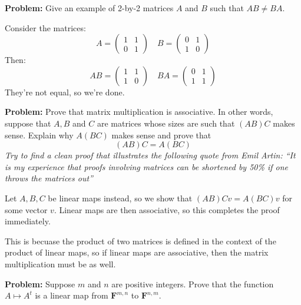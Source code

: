 \documentclass[10pt]{article}
\newcommand{\F}{\mathbf F}
\newenvironment{problem}{\textbf{Problem:}}{}
\begin{document}
	\begin{problem}
		Give an example of 2-by-2 matrices \( A \) and \( B \) such that \( AB \neq BA \). 
	\end{problem}

	\begin{solution}
		Consider the matrices:
		\[
			A = \begin{pmatrix} 1 & 1\\0 &1 \end{pmatrix}  \quad B = \begin{pmatrix} 0 & 1 \\ 1 & 0 \end{pmatrix} 
		\] 
		Then:
		\[
			AB = \begin{pmatrix} 1 & 1 \\ 1 & 0 \end{pmatrix} \quad BA = \begin{pmatrix} 0 & 1\\1 & 1 \end{pmatrix} 
		\] 
		They're not equal, so we're done. 
	\end{solution}

	\begin{problem}
		Prove that matrix multiplication is associative. In other words, suppose that \( A, B \) and \( C \) are 
		matrices whose sizes are such that \( (AB)C \) makes sense. Explain why \( A(BC) \) makes sense 
		and prove that 
		\[
			(AB)C = A(BC)
		\] 
		\textit{Try to find a clean proof that illustrates the following quote from Emil Artin: ``It is my 
		experience that proofs involving matrices can be shortened by 50\% if one throws the matrices out''}

		\begin{solution}
			Let \( A, B, C \) be linear maps instead, so we show that \( (AB)Cv = A(BC)v \) for some 
			vector  \( v \). Linear maps are then associative, so this completes the proof immediately. 

			This is becuase the product of two matrices is defined in the context of the product of linear maps, 
			so if linear maps are associative, then the matrix multiplication must be as well.   
		\end{solution}
	\end{problem}

	\begin{problem}
		Suppose \( m \) and \( n \) are positive integers. Prove that the function \( A \mapsto A^{t} \) 
		is a linear map from \( \F^{m, n} \) to \( \F^{n, m} \). 
	\end{problem}
\end{document}
